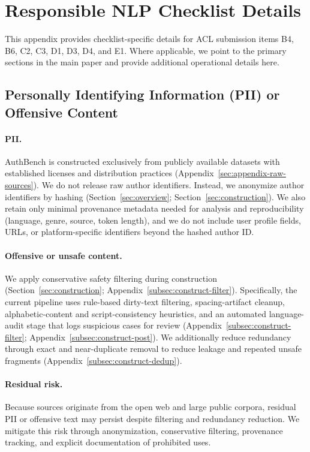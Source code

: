\documentclass{article}
\begin{document}
\section{Responsible NLP Checklist Details}
\label{sec:checklist}

This appendix provides checklist-specific details for ACL submission items B4, B6, C2, C3, D1, D3, D4, and E1.
Where applicable, we point to the primary sections in the main paper and provide additional operational details here.

\subsection{Personally Identifying Information (PII) or Offensive Content}
\label{sec:checklist-b4}
\paragraph{PII.}
AuthBench is constructed exclusively from publicly available datasets with established licenses and distribution practices (Appendix~\ref{sec:appendix-raw-sources}).
We do not release raw author identifiers. Instead, we anonymize author identifiers by hashing (Section~\ref{sec:overview}; Section~\ref{sec:construction}).
We also retain only minimal provenance metadata needed for analysis and reproducibility (language, genre, source, token length), and we do not include user profile fields, URLs, or platform-specific identifiers beyond the hashed author ID.

\paragraph{Offensive or unsafe content.}
We apply conservative safety filtering during construction (Section~\ref{sec:construction}; Appendix~\ref{subsec:construct-filter}).
{\color{red}Specifically, the current pipeline uses rule-based dirty-text filtering, spacing-artifact cleanup, alphabetic-content and script-consistency heuristics, and an automated language-audit stage that logs suspicious cases for review (Appendix~\ref{subsec:construct-filter}; Appendix~\ref{subsec:construct-post}).}
We additionally reduce redundancy through exact and near-duplicate removal to reduce leakage and repeated unsafe fragments (Appendix~\ref{subsec:construct-dedup}).

\paragraph{Residual risk.}
Because sources originate from the open web and large public corpora, residual PII or offensive text may persist despite filtering and redundancy reduction.
We mitigate this risk through anonymization, conservative filtering, provenance tracking, and explicit documentation of prohibited uses.
\end{document}
